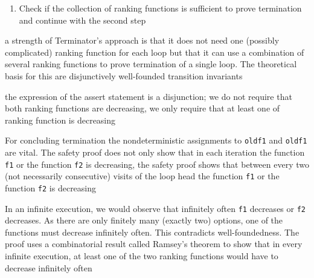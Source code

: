 \documentclass[landscape, a4paper]{article}
\begin{document}
\begin{minipage}[t]{0.2\linewidth}
\begin{betterlist}
\begin{enumerate}
			\item Check if the collection of ranking functions is sufficient to prove termination and continue with the second step
		\end{enumerate}
		\item a strength of Terminator’s approach is that it does not need one (possibly complicated) ranking function for each loop but that it can use a combination of several ranking functions to prove termination of a single loop. The theoretical basis for this are disjunctively well-founded transition invariants
		\item {}

		\begin{betterlist}
			\item the expression of the assert statement is a disjunction; we do not require that both ranking functions are decreasing, we only require that at least one of ranking function is decreasing
			\item For concluding termination the nondeterministic assignments to \verb|oldf1| and \verb|oldf1| are vital. The safety proof does not only show that in each iteration the function \verb|f1| or the function \verb|f2| is decreasing, the safety proof shows that between every two (not necessarily consecutive) visits of the loop head the function \verb|f1| or the function \verb|f2| is decreasing
			\item In an infinite execution, we would observe that infinitely often \verb|f1| decreases or \verb|f2| decreases. As there are only finitely many (exactly two) options, one of the functions must decrease infinitely often. This contradicts well-foundedness. The proof uses a combinatorial result called Ramsey’s theorem to show that in every infinite execution, at least one of the two ranking functions would have to decrease infinitely often

\end{betterlist}
\end{betterlist}
\end{minipage}
\end{document}
